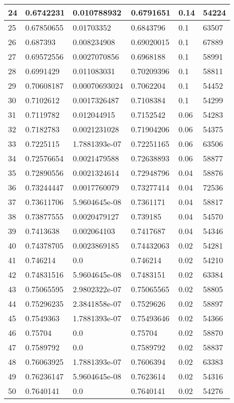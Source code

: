 \begin{longtable}{|l|l|l|l|l|l|}
24 & 0.6742231 & 0.010788932 & 0.6791651 & 0.14 & 54224 \\ \hline 
25 & 0.67850655 & 0.01703352 & 0.6843796 & 0.1 & 63507 \\ \hline 
26 & 0.687393 & 0.008234908 & 0.69020015 & 0.1 & 67889 \\ \hline 
27 & 0.69572556 & 0.0027070856 & 0.6968188 & 0.1 & 58991 \\ \hline 
28 & 0.6991429 & 0.011083031 & 0.70209396 & 0.1 & 58811 \\ \hline 
29 & 0.70608187 & 0.00070693024 & 0.7062204 & 0.1 & 54452 \\ \hline 
30 & 0.7102612 & 0.0017326487 & 0.7108384 & 0.1 & 54299 \\ \hline 
31 & 0.7119782 & 0.012044915 & 0.7152542 & 0.06 & 54283 \\ \hline 
32 & 0.7182783 & 0.0021231028 & 0.71904206 & 0.06 & 54375 \\ \hline 
33 & 0.7225115 & 1.7881393e-07 & 0.72251165 & 0.06 & 63506 \\ \hline 
34 & 0.72576654 & 0.0021479588 & 0.72638893 & 0.06 & 58877 \\ \hline 
35 & 0.72890556 & 0.0021324614 & 0.72948796 & 0.04 & 58876 \\ \hline 
36 & 0.73244447 & 0.0017760079 & 0.73277414 & 0.04 & 72536 \\ \hline 
37 & 0.73611706 & 5.9604645e-08 & 0.7361171 & 0.04 & 58817 \\ \hline 
38 & 0.73877555 & 0.0020479127 & 0.739185 & 0.04 & 54570 \\ \hline 
39 & 0.7413638 & 0.002064103 & 0.7417687 & 0.04 & 54346 \\ \hline 
40 & 0.74378705 & 0.0023869185 & 0.74432063 & 0.02 & 54281 \\ \hline 
41 & 0.746214 & 0.0 & 0.746214 & 0.02 & 54210 \\ \hline 
42 & 0.74831516 & 5.9604645e-08 & 0.7483151 & 0.02 & 63384 \\ \hline 
43 & 0.75065595 & 2.9802322e-07 & 0.75065565 & 0.02 & 58805 \\ \hline 
44 & 0.75296235 & 2.3841858e-07 & 0.7529626 & 0.02 & 58897 \\ \hline 
45 & 0.7549363 & 1.7881393e-07 & 0.75493646 & 0.02 & 54366 \\ \hline 
46 & 0.75704 & 0.0 & 0.75704 & 0.02 & 58870 \\ \hline 
47 & 0.7589792 & 0.0 & 0.7589792 & 0.02 & 58837 \\ \hline 
48 & 0.76063925 & 1.7881393e-07 & 0.7606394 & 0.02 & 63383 \\ \hline 
49 & 0.76236147 & 5.9604645e-08 & 0.7623614 & 0.02 & 54316 \\ \hline 
50 & 0.7640141 & 0.0 & 0.7640141 & 0.02 & 54276 \\ \hline 
\end{longtable}
